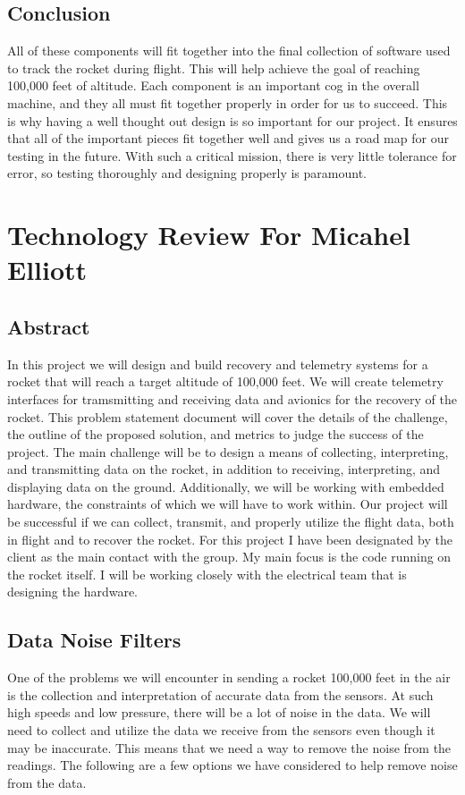 \documentclass[onecolumn, draftclsnofoot,10pt, compsoc]{IEEEtran}
\begin{document}
\subsection {Conclusion}
All of these components will fit together into the final collection of
software used to track the rocket during flight.
This will help achieve the goal of reaching 100,000 feet of altitude.
Each component is an important cog in the overall machine, and they
all must fit together properly in order for us to succeed.
This is why having a well thought out design is so important for our project.
It ensures that all of the important pieces fit together well and
gives us a road map for our testing in the future.
With such a critical mission, there is very little tolerance for
error, so testing thoroughly and designing properly is paramount.

\section{Technology Review For Micahel Elliott}
\subsection{Abstract}
In this project we will design and build recovery and telemetry systems for a rocket that will reach a target altitude of 100,000 feet.
We will create telemetry interfaces for tramsmitting and receiving data and avionics for the recovery of the rocket.
This problem statement document will cover the details of the challenge, the outline of the proposed solution, and metrics to judge the success of the project.
The main challenge will be to design a means of collecting, interpreting, and transmitting data on the rocket, in addition to receiving, interpreting, and displaying data on the ground.
Additionally, we will be working with embedded hardware, the constraints of which we will have to work within.
Our project will be successful if we can collect, transmit, and properly utilize the flight data, both in flight and to recover the rocket.
For this project I have been designated by the client as the main contact with the group.
My main focus is the code running on the rocket itself.
I will be working closely with the electrical team that is designing the hardware.
\subsection{Data Noise Filters}
One of the problems we will encounter in sending a rocket 100,000 feet in the air is the collection and interpretation of accurate data from the sensors.
At such high speeds and low pressure, there will be a lot of noise in the data.
We will need to collect and utilize the data we receive from the sensors even though it may be inaccurate.
This means that we need a way to remove the noise from the readings.
The following are a few options we have considered to help remove noise from the data.
\end{document}
